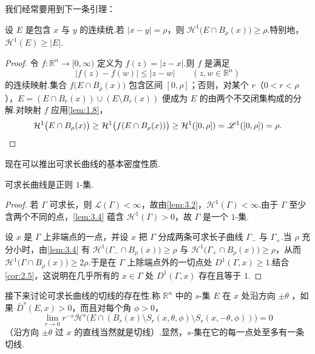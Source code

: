 我们经常要用到下一条引理：

\begin{lemma}\label{lem:3.4}
设 $E$ 是包含 $x$ 与 $y$ 的连续统.若 $|x-y|=\rho$，则 $\mathcal{H}^1\bigl(E\cap B_\rho(x)\bigr)\geq\rho$.特别地，$\mathcal{H}^1(E)\geq|E|$.
\end{lemma}

\begin{proof}
令 $f:\mathbb{R}^n\to[0,\infty)$ 定义为 $f(z)=|z-x|$.则 $f$ 是满足
\begin{equation}\label{eq:3.3}
  |f(z)-f(w)|\leq|z-w|\qquad(z,w\in\mathbb{R}^n)
\end{equation}
的连续映射.集合 $f\bigl(E\cap B_\rho(x)\bigr)$ 包含区间 $[0,\rho]$；否则，对某个 $r$（$0<r<\rho$），$E=(E\cap B_r(x))\cup(E\setminus B_r(x))$ 便成为 $E$ 的由两个不交闭集构成的分解.对映射 $f$ 应用\cref{lem:1.8}，
\[
  \mathcal{H}^{1}\bigl(E\cap B_{\rho}(x)\bigr)
  \geq\mathcal{H}^{1}\bigl(f(E\cap B_{\rho}(x))\bigr)
  \geq\mathcal{H}^{1}([0,\rho])=\mathscr{L}^{1}([0,\rho])=\rho. \qedhere
\]
\end{proof}

现在可以推出可求长曲线的基本密度性质.

\begin{lemma}\label{lem:3.5}
可求长曲线是正则 $1$-集.
\end{lemma}

\begin{proof}
若 $\Gamma$ 可求长，则 $\mathscr{L}(\Gamma)<\infty$，故由\cref{lem:3.2}，$\mathcal{H}^1(\Gamma)<\infty$.由于 $\Gamma$ 至少含两个不同的点，\cref{lem:3.4} 蕴含 $\mathcal{H}^1(\Gamma)>0$，故 $\Gamma$ 是一个 $1$-集.

设 $x$ 是 $\Gamma$ 上非端点的一点，并设 $x$ 把 $\Gamma$ 分成两条可求长子曲线 $\Gamma_-$ 与 $\Gamma_+$.当 $\rho$ 充分小时，由\cref{lem:3.4} 有 $\mathcal{H}^1\bigl(\Gamma_-\cap B_\rho(x)\bigr)\geq\rho$ 与 $\mathcal{H}^1\bigl(\Gamma_+\cap B_\rho(x)\bigr)\geq\rho$，从而 $\mathcal{H}^1\bigl(\Gamma\cap B_\rho(x)\bigr)\geq 2\rho$.于是在 $\Gamma$ 上除端点外的一切点处 $D^1(\Gamma,x)\geq 1$.结合\cref{cor:2.5}，这说明在几乎所有的 $x\in\Gamma$ 处 $D^1(\Gamma,x)$ 存在且等于 $1$.
\end{proof}

接下来讨论可求长曲线的切线的存在性.称 $\mathbb{R}^n$ 中的 $s$-集 $E$ 在 $x$ 处沿方向 $\pm\theta$ ，如果 $\bar{D}^s(E,x)>0$，而且对每个角 $\phi>0$，
\begin{equation}\label{eq:3.4}
  \lim_{r\to 0}r^{-s}\mathcal{H}^{s}\bigl(E\cap(B_r(x)\setminus S_r(x,\theta,\phi)\setminus S_r(x,-\theta,\phi))\bigr)=0
\end{equation}
（沿方向 $\pm\theta$ 过 $x$ 的直线当然就是切线）.显然，$s$-集在它的每一点处至多有一条切线.

